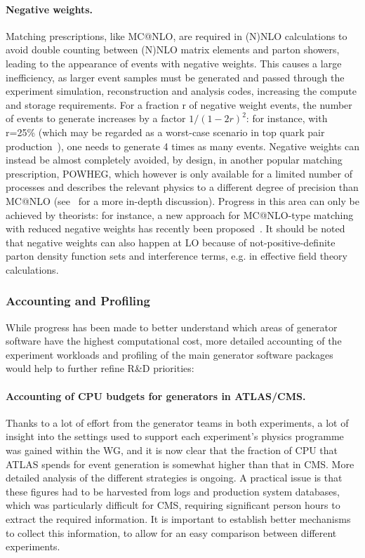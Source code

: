 \documentclass[11pt,a4paper]{article}
\begin{document}
\paragraph{Negative weights.} Matching prescriptions, like MC@NLO, are required
in (N)NLO calculations to avoid double counting between (N)NLO matrix
elements and parton showers, leading to the appearance of events with
negative weights. This causes a large inefficiency, as larger event
samples must be generated and passed through the experiment simulation,
reconstruction and analysis codes, increasing the compute and storage
requirements. For a fraction r of negative weight events, the number of
events to generate increases by a factor $1/(1-2r)^2$: for instance,
with r=25\% (which may be regarded as a worst-case scenario in top quark
pair production~\cite{Fre20}), one needs to generate 4 times as many
events. Negative weights can instead be almost completely avoided, by
design, in another popular matching prescription, POWHEG, which however
is only available for a limited number of processes and describes the
relevant physics to a different degree of precision than MC@NLO 
(see~\cite{Fre20} for a more in-depth discussion). Progress in this area can
only be achieved by theorists: for instance, a new approach for
MC@NLO-type matching with reduced negative weights has recently been
proposed~\cite{Fre20}. It should be noted that negative weights can also
happen at LO because of not-positive-definite parton density function
sets and interference terms, e.g. in effective field theory
calculations.

\subsubsection{Accounting and Profiling}

While progress has been made to better understand which areas of
generator software have the highest computational cost, more detailed
accounting of the experiment workloads and profiling of the main
generator software packages would help to further refine R\&D
priorities:

\paragraph{Accounting of CPU budgets for generators in ATLAS/CMS.} Thanks to a
lot of effort from the generator teams in both experiments, a lot of
insight into the settings used to support each experiment's physics
programme was gained within the WG, and it is now clear that the
fraction of CPU that ATLAS spends for event generation is somewhat
higher than that in CMS. More detailed analysis of the different
strategies is ongoing. A practical issue is that these figures had to be
harvested from logs and production system databases, which was
particularly difficult for CMS, requiring significant person hours to
extract the required information. It is important to establish better
mechanisms to collect this information, to allow for an easy comparison
between different experiments.
\end{document}

